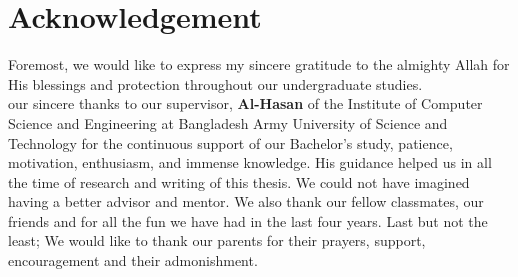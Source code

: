 \documentclass[12pt,a4paper]{article}
\begin{document}
	


\newpage


\newpage
\section*{Acknowledgement}
	Foremost, we would like to express my sincere gratitude to the almighty Allah for His blessings and protection throughout our undergraduate studies.\\ 
our sincere thanks to our supervisor,  \textbf{Al-Hasan} of the Institute of Computer Science and Engineering at Bangladesh Army University of Science and Technology for the continuous support of our Bachelor's study, patience, motivation, enthusiasm, and immense knowledge. His guidance helped us in all the time of research and writing of this thesis. We could not have imagined having a better advisor and mentor. We also thank our fellow classmates, our friends and for all the fun we have had in the last four years.
        Last but not the least; We would like to thank our parents for their prayers, support, encouragement and their admonishment.\\
\end{document}

